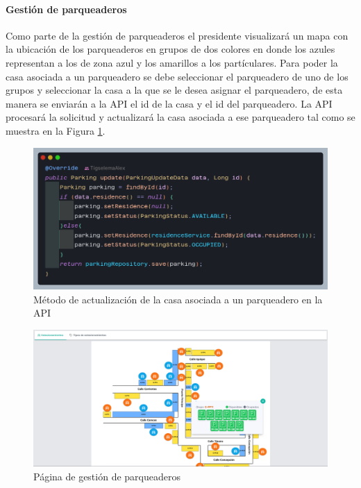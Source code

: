 \paragraph{Gestión de parqueaderos}

Como parte de la gestión de parqueaderos el presidente visualizará un mapa con la ubicación de los parqueaderos en grupos de dos colores en donde los azules representan a los de zona azul y los amarillos a los partículares.
Para poder la casa asociada a un parqueadero se debe seleccionar el parqueadero de uno de los grupos y seleccionar la casa a la que se le desea asignar el parqueadero, de esta manera se enviarán a la API el id de la casa y el id del parqueadero.
La API procesará la solicitud y actualizará la casa asociada a ese parqueadero tal como se muestra en la Figura \ref{fig:api-parking-update}.

\begin{figure}[H]
    \centering
    \includegraphics[width=1\textwidth]{resources/images/api-parking-update-method}
    \caption{Método de actualización de la casa asociada a un parqueadero en la API}
    \label{fig:api-parking-update}
\end{figure}

\begin{figure}[H]
    \centering
    \includegraphics[width=1\textwidth]{resources/images/sw-parking-group}
    \caption{Página de gestión de parqueaderos}
    \label{fig:sw-parking-group}
\end{figure}

